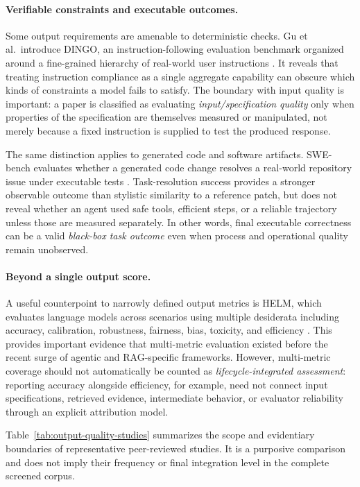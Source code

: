 \paragraph{Verifiable constraints and executable outcomes.}
Some output requirements are amenable to deterministic checks. Gu et al.\ introduce DINGO, an instruction-following evaluation benchmark organized around a fine-grained hierarchy of real-world user instructions \cite{gu2024dingo}. It reveals that treating instruction compliance as a single aggregate capability can obscure which kinds of constraints a model fails to satisfy. The boundary with input quality is important: a paper is classified as evaluating \emph{input/specification quality} only when properties of the specification are themselves measured or manipulated, not merely because a fixed instruction is supplied to test the produced response.

The same distinction applies to generated code and software artifacts. SWE-bench evaluates whether a generated code change resolves a real-world repository issue under executable tests \cite{jimenez2024swebench}. Task-resolution success provides a stronger observable outcome than stylistic similarity to a reference patch, but does not reveal whether an agent used safe tools, efficient steps, or a reliable trajectory unless those are measured separately. In other words, final executable correctness can be a valid \emph{black-box task outcome} even when process and operational quality remain unobserved.

\paragraph{Beyond a single output score.}
A useful counterpoint to narrowly defined output metrics is HELM, which evaluates language models across scenarios using multiple desiderata including accuracy, calibration, robustness, fairness, bias, toxicity, and efficiency \cite{liang2023helm}. This provides important evidence that multi-metric evaluation existed before the recent surge of agentic and RAG-specific frameworks. However, multi-metric coverage should not automatically be counted as \emph{lifecycle-integrated assessment}: reporting accuracy alongside efficiency, for example, need not connect input specifications, retrieved evidence, intermediate behavior, or evaluator reliability through an explicit attribution model.

Table~\ref{tab:output-quality-studies} summarizes the scope and evidentiary boundaries of representative peer-reviewed studies. It is a purposive comparison and does not imply their frequency or final integration level in the complete screened corpus.

